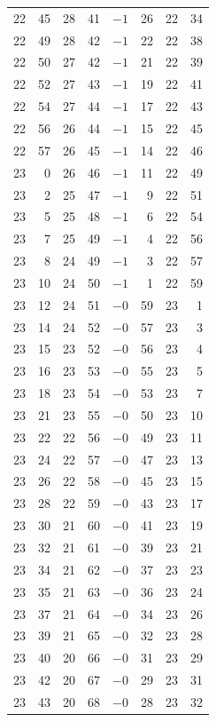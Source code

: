 \begin{center}
\begin{longtable}{rr c c rr rr}
22 & 45 & 28 & 41 & $-1$ & 26 & 22 & 34 \\
22 & 49 & 28 & 42 & $-1$ & 22 & 22 & 38 \\
22 & 50 & 27 & 42 & $-1$ & 21 & 22 & 39 \\
22 & 52 & 27 & 43 & $-1$ & 19 & 22 & 41 \\
22 & 54 & 27 & 44 & $-1$ & 17 & 22 & 43 \\
22 & 56 & 26 & 44 & $-1$ & 15 & 22 & 45 \\
22 & 57 & 26 & 45 & $-1$ & 14 & 22 & 46 \\
23 & 0 & 26 & 46 & $-1$ & 11 & 22 & 49 \\
23 & 2 & 25 & 47 & $-1$ & 9 & 22 & 51 \\
23 & 5 & 25 & 48 & $-1$ & 6 & 22 & 54 \\
23 & 7 & 25 & 49 & $-1$ & 4 & 22 & 56 \\
23 & 8 & 24 & 49 & $-1$ & 3 & 22 & 57 \\
23 & 10 & 24 & 50 & $-1$ & 1 & 22 & 59 \\
23 & 12 & 24 & 51 & $-0$ & 59 & 23 & 1 \\
23 & 14 & 24 & 52 & $-0$ & 57 & 23 & 3 \\
23 & 15 & 23 & 52 & $-0$ & 56 & 23 & 4 \\
23 & 16 & 23 & 53 & $-0$ & 55 & 23 & 5 \\
23 & 18 & 23 & 54 & $-0$ & 53 & 23 & 7 \\
23 & 21 & 23 & 55 & $-0$ & 50 & 23 & 10 \\
23 & 22 & 22 & 56 & $-0$ & 49 & 23 & 11 \\
23 & 24 & 22 & 57 & $-0$ & 47 & 23 & 13 \\
23 & 26 & 22 & 58 & $-0$ & 45 & 23 & 15 \\
23 & 28 & 22 & 59 & $-0$ & 43 & 23 & 17 \\
23 & 30 & 21 & 60 & $-0$ & 41 & 23 & 19 \\
23 & 32 & 21 & 61 & $-0$ & 39 & 23 & 21 \\
23 & 34 & 21 & 62 & $-0$ & 37 & 23 & 23 \\
23 & 35 & 21 & 63 & $-0$ & 36 & 23 & 24 \\
23 & 37 & 21 & 64 & $-0$ & 34 & 23 & 26 \\
23 & 39 & 21 & 65 & $-0$ & 32 & 23 & 28 \\
23 & 40 & 20 & 66 & $-0$ & 31 & 23 & 29 \\
23 & 42 & 20 & 67 & $-0$ & 29 & 23 & 31 \\
23 & 43 & 20 & 68 & $-0$ & 28 & 23 & 32 \\

\end{longtable}
\end{center}
